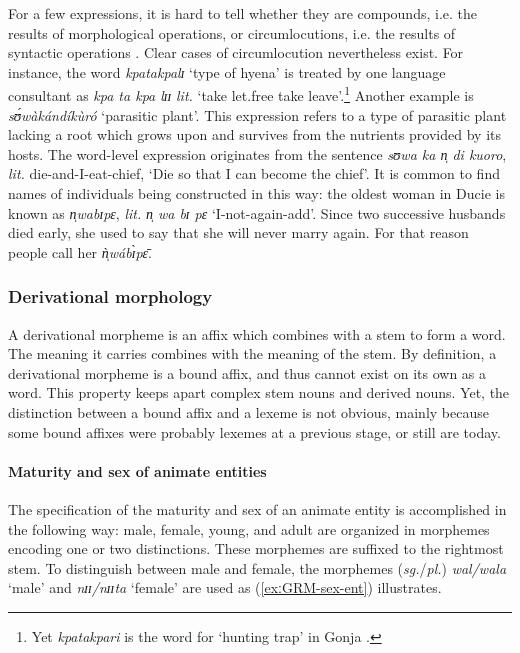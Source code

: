 \begin{exe}
\begin{exe}
\begin{exe}
{\begin{exe}
\begin{exe}
\begin{exe}
\begin{exe}
For a few expressions,  it is hard to tell whether they are compounds, i.e. the
results of  morphological operations, or circumlocutions, i.e.  the results of
syntactic operations \cite[165]{Alla01}. Clear cases of circumlocution
nevertheless exist. For instance,  the word {\it kpatakpalɪ} `type of hyena'  is
treated by one language consultant as {\it kpa ta kpa lɪɪ} {\it lit.}
 `take let.free take leave'.\footnote{Yet {\it kpatakpari} is the word for
`hunting trap' in Gonja \citep{Rytz66}.}  Another example is {\it 
sʊ́wàkándíkùró} `parasitic plant'. This expression refers to a type of
parasitic plant lacking a  root which grows upon and survives from the
nutrients provided by its  hosts. The word-level expression originates from the
sentence  {\it sʊwa ka n̩ di kuoro}, {\it lit.}  die-and-I-eat-chief, `Die so
that I can become the chief'. It is common to find names of individuals being
constructed in this way: the oldest woman in Ducie is known as {\it n̩wabɪpɛ}, 
{\it lit.}  {\it n̩ wa bɪ pɛ}  `I-not-again-add'. Since two successive husbands 
died early,  she used to say that she will never marry again. For that reason
people call her {\it ǹ̩wábɪ̀pɛ̄}.  



\subsubsection{Derivational morphology}
\label{sec:GRM-der-morph}

A derivational morpheme is an affix which combines with a stem to form a word.
The meaning it carries combines with the meaning of the stem.     By definition,
a derivational morpheme is a bound affix, and  thus 
cannot exist on its own as a word. This property keeps apart complex
stem nouns and derived nouns. Yet, the distinction between a bound affix and
a lexeme is not obvious, mainly because some bound affixes were probably lexemes
at a previous stage, or still are today. 


\paragraph{Maturity and sex of animate entities}
\label{sec:GRM-der-matur}


The specification of the maturity
and sex of an animate entity is accomplished in the following
way: male, female, young, and adult are organized in morphemes encoding
one or two distinctions. These morphemes are suffixed to the rightmost stem.
To distinguish between male and female, the morphemes ({\it sg.}/{\it pl.}) 
{\it wal/wala} `male'  and {\it nɪɪ/nɪɪta} `female'  are used as
(\ref{exːGRM-sex-ent}) illustrates.



\end{exe}
\end{exe}
\end{exe}
\end{exe}}
\end{exe}
\end{exe}
\end{exe}
